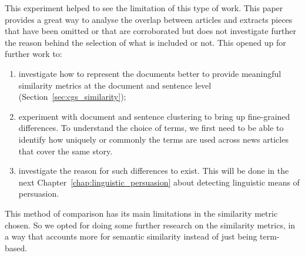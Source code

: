 

This experiment helped to see the limitation of this type of work. %
This paper provides a great way to analyse the overlap between articles and extracts pieces that have been omitted or that are corroborated but does not investigate further the reason behind the selection of what is included or not.
This opened up for further work to:
\begin{enumerate}
    \item investigate how to represent the documents better to provide meaningful similarity metrics at the document and sentence level (Section~\ref{sec:cgs_similarity}); %
    \item experiment with document and sentence clustering to bring up fine-grained differences. To understand the choice of terms, we first need to be able to identify how uniquely or commonly the terms are used across news articles that cover the same story. %
    \item investigate the reason for such differences to exist. This will be done in the next Chapter~\ref{chap:linguistic_persuasion} about detecting linguistic means of persuasion.
\end{enumerate}

This method of comparison has its main limitations in the similarity metric chosen. So we opted for doing some further research on the similarity metrics, in a way that accounts more for semantic similarity instead of just being term-based.


